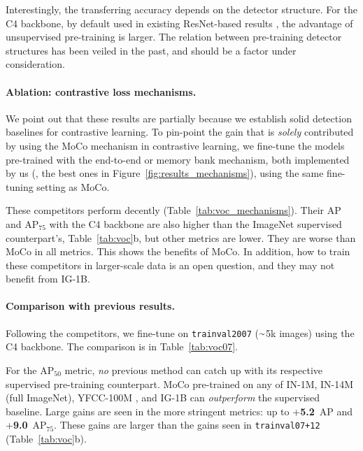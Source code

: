 \documentclass[10pt,twocolumn,letterpaper]{article}
\newcommand{\app}{\raise.17ex\hbox{$\scriptstyle\sim$}}
\begin{document}
Interestingly, the transferring accuracy depends on the detector structure. For the C4 backbone, by default used in existing ResNet-based results \cite{Doersch2017,Wu2018a,Goyal2019,Zhuang2019}, the advantage of unsupervised pre-training is larger. The relation between pre-training \vs detector structures has been veiled in the past, and should be a factor under consideration.

\paragraph{Ablation: contrastive loss mechanisms.}
We point out that these results are partially because we establish solid detection baselines for contrastive learning. 
To pin-point the gain that is \emph{solely} contributed by using the MoCo mechanism in contrastive learning, we fine-tune the models pre-trained with the end-to-end or memory bank mechanism, both implemented by us (\ie, the best ones in Figure~\ref{fig:results_mechanisms}), using the same fine-tuning setting as MoCo.

These competitors perform decently (Table~\ref{tab:voc_mechanisms}). Their AP and AP$_\text{75}$ with the C4 backbone are also higher than the ImageNet supervised counterpart's, \cf Table~\ref{tab:voc}b, but other metrics are lower.
They are worse than MoCo in all metrics. This shows the benefits of MoCo.  In addition, how to train these competitors in larger-scale data is an open question, and they may not benefit from IG-1B.

\paragraph{Comparison with previous results.} Following the competitors, we fine-tune on \texttt{trainval2007} ($\app$5k images) using the C4 backbone. The comparison is in Table~\ref{tab:voc07}.

For the AP$_\text{50}$ metric, \emph{no} previous method can catch up with its respective supervised pre-training counterpart. MoCo pre-trained on any of IN-1M, IN-14M (full ImageNet), YFCC-100M \cite{Thomee2016}, and IG-1B can \emph{outperform} the supervised baseline. Large gains are seen in the more stringent metrics: up to +\textbf{5.2}~AP and +\textbf{9.0}~AP$_\text{75}$. These gains are larger than the gains seen in \texttt{trainval07+12} (Table~\ref{tab:voc}b).

\newcommand{\cres}[1]{#1}
\newcommand{\cresrand}[1]{#1}
\end{document}
